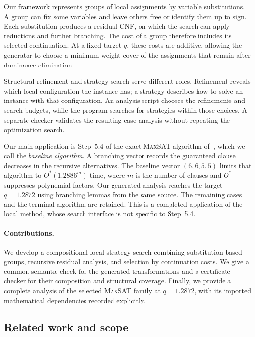 \documentclass[11pt]{article}
\newcommand{\MaxSAT}{\textnormal{\textsc{MaxSAT}}}
\newcommand{\OhStar}{O^*}
\theoremstyle{definition}
\theoremstyle{remark}
\begin{document}
Our framework represents groups of local assignments by variable
substitutions. A group can fix some variables and leave others free or
identify them up to sign. Each substitution produces a residual CNF, on which
the search can apply reductions and further branching. The cost of a group
therefore includes its selected continuation. At a fixed target $q$, these
costs are additive, allowing the generator to choose a minimum-weight cover
of the assignments that remain after dominance elimination.

Structural refinement and strategy search serve different roles. Refinement
reveals which local configuration the instance has; a strategy describes how
to solve an instance with that configuration. An analysis script chooses the
refinements and search budgets, while the program searches for strategies
within those choices. A separate checker validates the resulting case analysis
without repeating the optimization search.

Our main application is Step~5.4 of the exact \MaxSAT{} algorithm
of~\cite{Xiao2022}, which we call the \emph{baseline algorithm}.
A branching vector records the guaranteed clause decreases in the recursive
alternatives. The baseline vector $(6,6,5,5)$ limits that algorithm to
$\OhStar(1.2886^m)$ time, where $m$ is the number of clauses and $\OhStar$
suppresses polynomial factors. Our generated analysis reaches the target
$q=1.2872$ using branching lemmas from the same source. The remaining cases
and the terminal algorithm are retained. This is a completed application of
the local method, whose search interface is not specific to Step~5.4.

\paragraph{Contributions.}
We develop a compositional local strategy search combining substitution-based
groups, recursive residual analysis, and selection by continuation costs.
We give a common semantic check for the generated transformations and a
certificate checker for their composition and structural coverage. Finally,
we provide a complete analysis of the selected \MaxSAT{} family at
$q=1.2872$, with its imported mathematical dependencies recorded explicitly.

\subsection{Related work and scope}
\label{sec:related}
\end{document}
